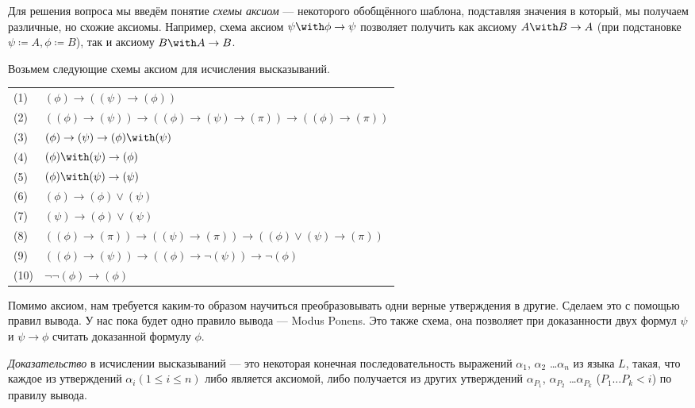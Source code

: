 Для решения вопроса мы введём понятие \emph{схемы аксиом} --- некоторого обобщённого
шаблона, подставляя значения в который, мы получаем различные, но схожие аксиомы. 
Например, схема аксиом $\psi \with \phi \rightarrow \psi$ позволяет получить как
аксиому $A \with B \rightarrow A$ (при подстановке $\psi \coloneqq  A, \phi \coloneqq  B$), так и
аксиому $B \with A \rightarrow B$.

Возьмем следующие схемы аксиом для исчисления высказываний.

\begin{tabular}{ll}
(1) & $(\phi) \rightarrow ((\psi) \rightarrow (\phi))$ \\
(2) & $((\phi) \rightarrow (\psi)) \rightarrow ((\phi) \rightarrow (\psi) \rightarrow (\pi)) \rightarrow ((\phi) \rightarrow (\pi))$ \\
(3) & $(\phi) \rightarrow (\psi) \rightarrow (\phi) \with (\psi)$\\
(4) & $(\phi) \with (\psi) \rightarrow (\phi)$\\
(5) & $(\phi) \with (\psi) \rightarrow (\psi)$\\
(6) & $(\phi) \rightarrow (\phi) \vee (\psi)$\\
(7) & $(\psi) \rightarrow (\phi) \vee (\psi)$\\
(8) & $((\phi) \rightarrow (\pi)) \rightarrow ((\psi) \rightarrow (\pi)) \rightarrow ((\phi) \vee (\psi) \rightarrow (\pi))$\\
(9) & $((\phi) \rightarrow (\psi)) \rightarrow ((\phi) \rightarrow \neg (\psi)) \rightarrow \neg (\phi)$\\
(10) & $\neg \neg (\phi) \rightarrow (\phi)$
\end{tabular}

Помимо аксиом, нам требуется каким-то образом научиться преобразовывать одни верные утверждения
в другие.
Сделаем это с помощью правил вывода. У нас пока будет одно правило вывода --- Modus Ponens.
Это также схема, она позволяет при доказанности двух формул $\psi$ и $\psi \rightarrow \phi$
считать доказанной формулу $\phi$.

\begin{definition} \emph{Доказательство} в исчислении высказываний --- 
это некоторая конечная последовательность выражений 
$\alpha_1$, $\alpha_2$ \dots $\alpha_n$
из языка $L$, такая, что каждое из утверждений $\alpha_i (1 \le i \le n)$
либо является аксиомой, либо получается из других
утверждений $\alpha_{P_1}$, $\alpha_{P_2}$ \dots $\alpha_{P_k}$ 
($P_1 \dots P_k < i$) по правилу вывода.
\end{definition}

